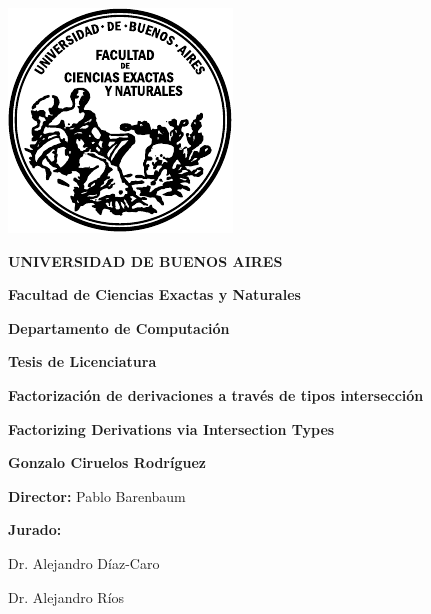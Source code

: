 
\thispagestyle{empty}

\begin {center}

\includegraphics[scale=.4,natwidth=100,natheight=100]{template_tesis/logofcen.pdf}

\medskip
\textbf{UNIVERSIDAD DE BUENOS AIRES}

\smallskip

\textbf{Facultad de Ciencias Exactas y Naturales}

\smallskip

\textbf{Departamento de Computaci\'on}

\vspace{3.5cm}

\textbf{\large Tesis de Licenciatura}


\vspace{1.5cm}

\textbf{\Large Factorizaci\'on de derivaciones a trav\'es de tipos intersecci\'on}

\textbf{\large Factorizing Derivations via Intersection Types}

\vspace{1.5cm}


\textbf{\large Gonzalo Ciruelos Rodríguez}

\end {center}


\vspace{1.5cm}

\noindent \textbf{Director:} Pablo Barenbaum


\vspace{3cm}


\vspace{1cm}
\noindent
\textbf{Jurado:}

Dr. Alejandro Díaz-Caro

Dr. Alejandro Ríos
